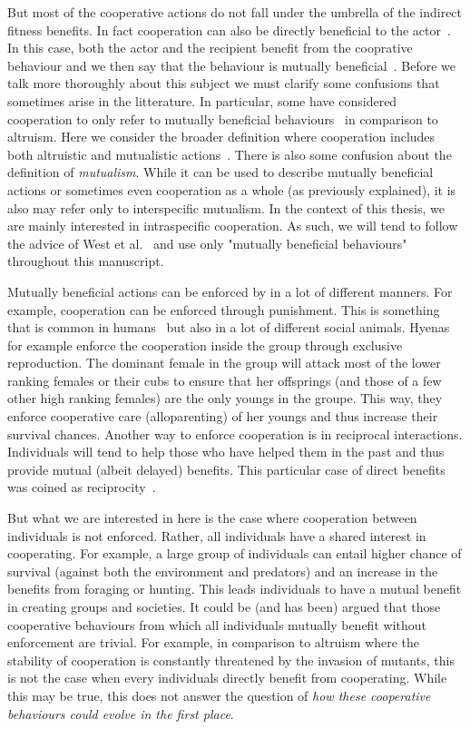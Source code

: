     But most of the cooperative actions do not fall under the umbrella of the indirect fitness benefits. In fact cooperation can also be directly beneficial to the actor~\parencite{Leimar2010}. In this case, both the actor and the recipient benefit from the cooprative behaviour and we then say that the behaviour is mutually beneficial~\parencite{West2007a}. Before we talk more thoroughly about this subject we must clarify some confusions that sometimes arise in the litterature. In particular, some have considered cooperation to only refer to mutually beneficial behaviours~\parencite{Trivers1985, Lehmann2006} in comparison to altruism. Here we consider the broader definition where cooperation includes both altruistic and mutualistic actions~\parencite{West2007a}. There is also some confusion about the definition of \emph{mutualism}. While it can be used to describe mutually beneficial actions or sometimes even cooperation as a whole (as previously explained), it is also may refer only to interspecific mutualism. In the context of this thesis, we are mainly interested in intraspecific cooperation. As such, we will tend to follow the advice of West et al.~\parencite{West2007} and use only "mutually beneficial behaviours" throughout this manuscript.

    Mutually beneficial actions can be enforced by in a lot of different manners. For example, cooperation can be enforced through punishment. This is something that is common in humans~\parencite{Fehr2002} but also in a lot of different social animals. Hyenas for example enforce the cooperation inside the group through exclusive reproduction. The dominant female in the group will attack most of the lower ranking females or their cubs to ensure that her offsprings (and those of a few other high ranking females) are the only youngs in the groupe. This way, they enforce cooperative care (alloparenting) of her youngs and thus increase their survival chances. Another way to enforce cooperation is in reciprocal interactions. Individuals will tend to help those who have helped them in the past and thus provide mutual (albeit delayed) benefits. This particular case of direct benefits was coined as reciprocity~\parencite{Trivers1971, Lehmann2006}.


    But what we are interested in here is the case where cooperation between individuals is not enforced. Rather, all individuals have a shared interest in cooperating. For example, a large group of individuals can entail higher chance of survival (against both the environment and predators) and an increase in the benefits from foraging or hunting. This leads individuals to have a mutual benefit in creating groups and societies. It could be (and has been) argued that those cooperative behaviours from which all individuals mutually benefit without enforcement are trivial. For example, in comparison to altruism where the stability of cooperation is constantly threatened by the invasion of mutants, this is not the case when every individuals directly benefit from cooperating. While this may be true, this does not answer the question of \emph{how these cooperative behaviours could evolve in the first place}.

